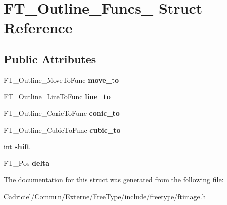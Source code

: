 \hypertarget{struct_f_t___outline___funcs__}{}\section{F\+T\+\_\+\+Outline\+\_\+\+Funcs\+\_\+ Struct Reference}
\label{struct_f_t___outline___funcs__}
\subsection*{Public Attributes}
\begin{DoxyCompactItemize}
\item 
F\+T\+\_\+\+Outline\+\_\+\+Move\+To\+Func {\bfseries move\+\_\+to}\hypertarget{struct_f_t___outline___funcs___abd53463a59a1ae2c6998e619c2ab6a65}{}\label{struct_f_t___outline___funcs___abd53463a59a1ae2c6998e619c2ab6a65}

\item 
F\+T\+\_\+\+Outline\+\_\+\+Line\+To\+Func {\bfseries line\+\_\+to}\hypertarget{struct_f_t___outline___funcs___a876fc8ca7541786cd3c4ec3806f88360}{}\label{struct_f_t___outline___funcs___a876fc8ca7541786cd3c4ec3806f88360}

\item 
F\+T\+\_\+\+Outline\+\_\+\+Conic\+To\+Func {\bfseries conic\+\_\+to}\hypertarget{struct_f_t___outline___funcs___a09681f5a64189066d3fba3cf398a135b}{}\label{struct_f_t___outline___funcs___a09681f5a64189066d3fba3cf398a135b}

\item 
F\+T\+\_\+\+Outline\+\_\+\+Cubic\+To\+Func {\bfseries cubic\+\_\+to}\hypertarget{struct_f_t___outline___funcs___aa3e0c1bacb181a5f43c104ab7f72cfda}{}\label{struct_f_t___outline___funcs___aa3e0c1bacb181a5f43c104ab7f72cfda}

\item 
int {\bfseries shift}\hypertarget{struct_f_t___outline___funcs___a540c246669b21b86cb405b3d9019cfda}{}\label{struct_f_t___outline___funcs___a540c246669b21b86cb405b3d9019cfda}

\item 
F\+T\+\_\+\+Pos {\bfseries delta}\hypertarget{struct_f_t___outline___funcs___a3c3121398b3ff564b4f3fd5b2a318e5e}{}\label{struct_f_t___outline___funcs___a3c3121398b3ff564b4f3fd5b2a318e5e}

\end{DoxyCompactItemize}


The documentation for this struct was generated from the following file\+:\begin{DoxyCompactItemize}
\item 
Cadriciel/\+Commun/\+Externe/\+Free\+Type/include/freetype/ftimage.\+h\end{DoxyCompactItemize}
